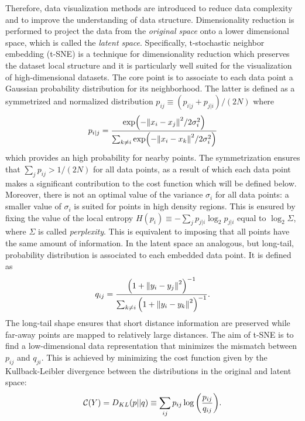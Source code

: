\documentclass[prl,twocolumn]{revtex4-1}
\begin{document}
Therefore, data visualization methods are  introduced to reduce data complexity and to improve the understanding of data structure.
Dimensionality reduction is performed to project the data from the \textit{original space} onto a lower dimensional space, which is called the \textit{latent space}. Specifically, t-stochastic neighbor embedding (t-SNE) is a technique for dimensionality reduction which preserves the dataset local structure and it is particularly well suited for the visualization of high-dimensional datasets.
The core point is to associate to each data point a Gaussian probability distribution for its neighborhood.
The latter is defined as a symmetrized and normalized distribution \(p_{ij} \equiv (p_{i|j}+p_{j|i})/(2N) \) where
\begin{equation}
    p_{i|j} = \frac{\exp (- \norm{x_i-x_j}^2/2 \sigma ^2_i ) }
    { \sum_{k \neq i}^{} \exp (- \norm{x_i-x_k}^2/2 \sigma ^2_i ) }
\end{equation}
which provides an high probability for nearby points.
The symmetrization ensures that \( \sum_j p_{ij} > 1/(2N) \) for all data points, as a result of which each data point makes a significant contribution to the cost function which will be defined below.
Moreover, there is not an optimal value of the variance \( \sigma_i \) for all data points: a smaller value of \( \sigma_i \) is suited for points in high density regions. This is ensured by fixing the value of the local entropy \( H(p_i) \equiv -\sum_j p_{j|i} \log_2 p_{j|i}\) equal to \( \log_2{\Sigma}\), where \(\Sigma\) is called \textit{perplexity}. This is equivalent to imposing that all points have the same amount of information.
In the latent space an analogous, but long-tail, probability distribution is associated to each embedded data point. It is defined as
\begin{equation}
    q_{ij} = \frac{\qty(1 + \norm{y_i-y_j}^2)^{-1}  }
    { \sum_{k \neq i}^{} \qty(1 + \norm{y_i-y_k}^2)^{-1} }.
\end{equation}
The long-tail shape ensures that short distance information are preserved while far-away points are mapped to relatively large distances.
The aim of t-SNE is to find a low-dimensional data representation that minimizes the mismatch between \(p_{ij}\) and \(q_{ji}\). This is achieved by minimizing the cost function given by the Kullback-Leibler divergence between the distributions in the original and latent space:
\begin{equation}
    \mathcal{C}(Y)= D_{KL} (p||q) \equiv \sum_{ij} p_{ij} \log          \qty(\frac{p_{ij}}{q_{ij}}).
\end{equation}
\end{document}
